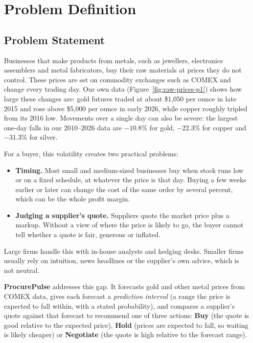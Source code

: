 \section{Problem Definition}
\label{sec:problem}

\subsection{Problem Statement}

Businesses that make products from metals, such as jewellers, electronics
assemblers and metal fabricators, buy their raw materials at prices they do not
control. These prices are set on commodity exchanges such as COMEX and change
every trading day. Our own data (Figure~\ref{fig:raw-prices-p1}) shows how large
these changes are: gold futures traded at about \$1,050 per ounce in late 2015
and rose above \$5,000 per ounce in early 2026, while copper roughly tripled
from its 2016 low. Movements over a single day can also be severe: the largest
one-day falls in our 2010--2026 data are $-10.8\%$ for gold, $-22.3\%$ for
copper and $-31.3\%$ for silver.

For a buyer, this volatility creates two practical problems:

\begin{itemize}
  \item \textbf{Timing.} Most small and medium-sized businesses buy when stock
        runs low or on a fixed schedule, at whatever the price is that day.
        Buying a few weeks earlier or later can change the cost of the same
        order by several percent, which can be the whole profit margin.
  \item \textbf{Judging a supplier's quote.} Suppliers quote the market price
        plus a markup. Without a view of where the price is likely to go, the
        buyer cannot tell whether a quote is fair, generous or inflated.
\end{itemize}

Large firms handle this with in-house analysts and hedging desks. Smaller firms
usually rely on intuition, news headlines or the supplier's own advice, which
is not neutral.

\textbf{ProcurePulse} addresses this gap. It forecasts gold and other metal
prices from COMEX data, gives each forecast a \emph{prediction interval} (a
range the price is expected to fall within, with a stated probability), and
compares a supplier's quote against that forecast to recommend one of three
actions: \textbf{Buy} (the quote is good relative to the expected price),
\textbf{Hold} (prices are expected to fall, so waiting is likely cheaper) or
\textbf{Negotiate} (the quote is high relative to the forecast range).

